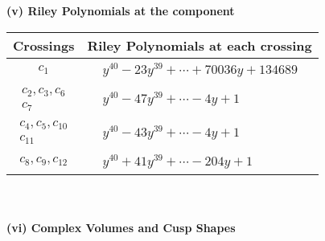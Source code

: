 \documentclass[1p]{elsarticle_modified}
\theoremstyle{definition}
\begin{document}
\flushleft \textbf{(v) Riley Polynomials at the component}\newline \\
\begin{tabular}{m{50pt}|m{274pt}}
Crossings & \hspace{64pt}Riley Polynomials at each crossing \\
\hline $$\begin{aligned}c_{1}\end{aligned}$$&$\begin{aligned}
&y^{40}-23 y^{39}+\cdots+70036 y+134689
\end{aligned}$\\
\hline $$\begin{aligned}c_{2},c_{3},c_{6}\\c_{7}\end{aligned}$$&$\begin{aligned}
&y^{40}-47 y^{39}+\cdots-4 y+1
\end{aligned}$\\
\hline $$\begin{aligned}c_{4},c_{5},c_{10}\\c_{11}\end{aligned}$$&$\begin{aligned}
&y^{40}-43 y^{39}+\cdots-4 y+1
\end{aligned}$\\
\hline $$\begin{aligned}c_{8},c_{9},c_{12}\end{aligned}$$&$\begin{aligned}
&y^{40}+41 y^{39}+\cdots-204 y+1
\end{aligned}$\\
\hline
\end{tabular}\\~\\
\newpage\flushleft \textbf{(vi) Complex Volumes and Cusp Shapes}
\end{document}
